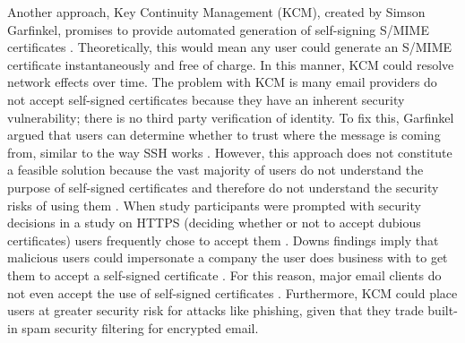 \documentclass{sig-alternate-05-2015}
\begin{document}
\par Another approach, Key Continuity Management (KCM), created by Simson Garfinkel, promises to provide automated generation of self-signing S/MIME certificates \cite{garfinkel2005johnny}. Theoretically, this would mean any user could generate an S/MIME certificate instantaneously and free of charge. In this manner, KCM could resolve network effects over time. The problem with KCM is many email providers do not accept self-signed certificates because they have an inherent security vulnerability; there is no third party verification of identity. To fix this, Garfinkel argued that users can determine whether to trust where the message is coming from, similar to the way SSH works \cite{garfinkel2005make}. However, this approach does not constitute a feasible solution because the vast majority of users do not understand the purpose of self-signed certificates and therefore do not understand the security risks of using them \cite{downs2006decision}. When study participants were prompted with security decisions in a study on HTTPS (deciding whether or not to accept dubious certificates) users frequently chose to accept them \cite{callegati2009man}. Downs findings imply that malicious users could impersonate a company the user does business with to get them to accept a self-signed certificate \cite{downs2006decision}. For this reason, major email clients do not even accept the use of self-signed certificates \cite{force-use-of-self}. Furthermore, KCM could place users at greater security risk for attacks like phishing, given that they trade built-in spam security filtering for encrypted email.
\end{document}
